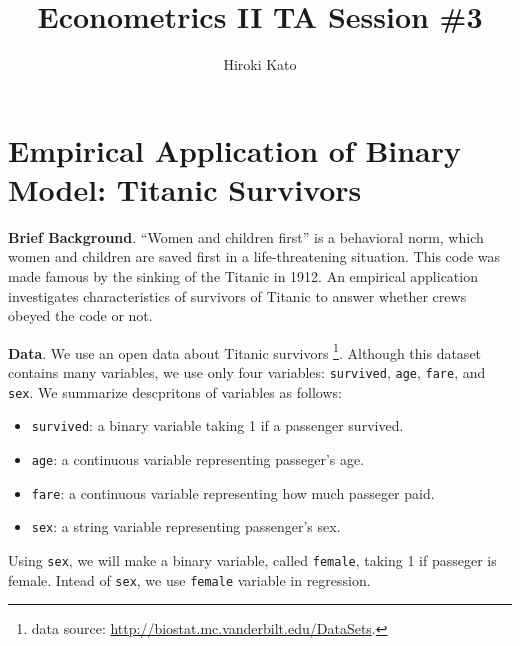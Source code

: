 \documentclass[
  12pt,
]{article}
\title{Econometrics II TA Session \#3}
\author{Hiroki Kato}
\date{}
\providecommand{\tightlist}{%
  \setlength{\itemsep}{0pt}\setlength{\parskip}{0pt}}
\begin{document}
\maketitle

\hypertarget{empirical-application-of-binary-model-titanic-survivors}{%
\section{Empirical Application of Binary Model: Titanic
Survivors}\label{empirical-application-of-binary-model-titanic-survivors}}

\textbf{Brief Background}. ``Women and children first'' is a behavioral
norm, which women and children are saved first in a life-threatening
situation. This code was made famous by the sinking of the Titanic in
1912. An empirical application investigates characteristics of survivors
of Titanic to answer whether crews obeyed the code or not.

\noindent \textbf{Data}. We use an open data about Titanic survivors
\footnote{data source: \url{http://biostat.mc.vanderbilt.edu/DataSets}.}.
Although this dataset contains many variables, we use only four
variables: \texttt{survived}, \texttt{age}, \texttt{fare}, and
\texttt{sex}. We summarize descpritons of variables as follows:

\begin{itemize}
\tightlist
\item
  \texttt{survived}: a binary variable taking 1 if a passenger survived.
\item
  \texttt{age}: a continuous variable representing passeger's age.
\item
  \texttt{fare}: a continuous variable representing how much passeger
  paid.
\item
  \texttt{sex}: a string variable representing passenger's sex.
\end{itemize}

Using \texttt{sex}, we will make a binary variable, called
\texttt{female}, taking 1 if passeger is female. Intead of \texttt{sex},
we use \texttt{female} variable in regression.
\end{document}
